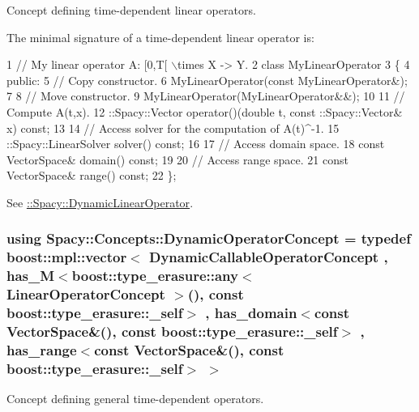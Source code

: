 Concept defining time-\/dependent linear operators. 

\label{group__ConceptGroup_ga015b0d099011a2ef73a16aa9b36a7346_DynamicLinearOperatorConceptAnchor}%
\hypertarget{group__ConceptGroup_ga015b0d099011a2ef73a16aa9b36a7346_DynamicLinearOperatorConceptAnchor}{}%
The minimal signature of a time-\/dependent linear operator is\+: 
\begin{DoxyCode}
1 // My linear operator A: [0,T[ \(\backslash\)times X -> Y.
2 class MyLinearOperator
3 \{
4 public:
5   // Copy constructor.
6   MyLinearOperator(const MyLinearOperator&);
7 
8   // Move constructor.
9   MyLinearOperator(MyLinearOperator&&);
10 
11   // Compute A(t,x).
12   ::Spacy::Vector operator()(double t, const ::Spacy::Vector& x) const;
13 
14   // Access solver for the computation of A(t)^-1.
15   ::Spacy::LinearSolver solver() const;
16 
17   // Access domain space.
18   const VectorSpace& domain() const;
19 
20   // Access range space.
21   const VectorSpace& range() const;
22 \};
\end{DoxyCode}


See \hyperlink{group__SpacyGroup_gaad10aa7d5443703377b768fa41a3c7ea_DynamicLinearOperatorAnchor}{\+:\+:Spacy\+:\+:Dynamic\+Linear\+Operator}. \hypertarget{group__ConceptGroup_ga2c979d268f0ca7a436776a9631d10af7_ga2c979d268f0ca7a436776a9631d10af7}{}
\subsubsection[{Dynamic\+Operator\+Concept}]{\setlength{\rightskip}{0pt plus 5cm}using {\bf Spacy\+::\+Concepts\+::\+Dynamic\+Operator\+Concept} = typedef boost\+::mpl\+::vector$<$ {\bf Dynamic\+Callable\+Operator\+Concept} , has\+\_\+\+M$<$boost\+::type\+\_\+erasure\+::any$<$ {\bf Linear\+Operator\+Concept} $>$(), const boost\+::type\+\_\+erasure\+::\+\_\+self$>$ , has\+\_\+domain$<$const {\bf Vector\+Space}\&(), const boost\+::type\+\_\+erasure\+::\+\_\+self$>$ , has\+\_\+range$<$const {\bf Vector\+Space}\&(), const boost\+::type\+\_\+erasure\+::\+\_\+self$>$ $>$}\label{group__ConceptGroup_ga2c979d268f0ca7a436776a9631d10af7_ga2c979d268f0ca7a436776a9631d10af7}


Concept defining general time-\/dependent operators. 

